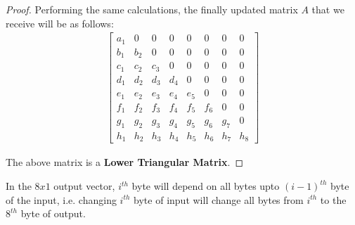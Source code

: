 \documentclass[10pt,twoside]{article}
\begin{document}
\begin{proof}
  Performing the same calculations, the finally updated matrix $A$ that we receive will be as follows:
  \begin{align}
    \begin{bmatrix}
    a_1 & 0 & 0 & 0 & 0 & 0 & 0 & 0\\
    b_1 & b_2 & 0 & 0 & 0 & 0 & 0 & 0\\
    c_1 & c_2 & c_3 & 0 & 0 & 0 & 0 & 0\\
    d_1 & d_2 & d_3 & d_4 & 0 & 0 & 0 & 0\\
    e_1 & e_2 & e_3 & e_4 & e_5 & 0 & 0 & 0\\
    f_1 & f_2 & f_3 & f_4 & f_5 & f_6 & 0 & 0\\
    g_1 & g_2 & g_3 & g_4 & g_5 & g_6 & g_7 & 0\\
    h_1 & h_2 & h_3 & h_4 & h_5 & h_6 & h_7 & h_8
    \end{bmatrix} \label{eq:1}
  \end{align}

  The above matrix is a \textbf{Lower Triangular Matrix}.
\end{proof}

\begin{lemma} \label{lem:2}
  In the $8x1$ output vector, $i^{th}$ byte will depend on all bytes upto $(i-1)^{th}$ byte of the input, i.e. changing $i^{th}$ byte of input will change all bytes from $i^{th}$ to the $8^{th}$ byte of output.
\end{lemma}
\end{document}
